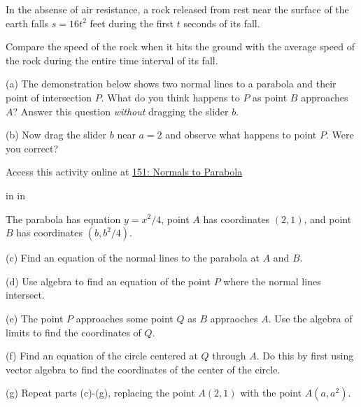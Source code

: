 \documentclass{ximera}
\newcommand{\pskip}{\vskip 0.1 in}
\begin{document}
\begin{question}  \label{Qdfgbbvvd}
In the absense of air resistance, a rock released from rest near the surface of the earth falls $s=16t^2$ feet during the first $t$ seconds of its fall.

Compare the speed of the rock when it hits the ground with the average speed of the rock during the entire time interval of its fall.
\end{question}



\begin{question}  \label{Qwerdfggg}
(a) The demonstration below shows two normal lines to a parabola and their point of intersection $P$. What do you think happens to $P$ as point $B$ approaches $A$? Answer this question \emph{without} dragging the slider $b$.

(b) Now drag the slider $b$ near $a=2$ and observe what happens to point $P$. Were you correct? 


 
\begin{onlineOnly}
    \begin{center}
\end{center}
\end{onlineOnly}
Access this activity online at \href{https://www.desmos.com/calculator/ybaivhc2tl}{151: Normals to Parabola}

\pskip \pskip

The parabola has equation $y=x^2/4$, point $A$ has coordinates $(2,1)$, and point $B$ has coordinates $(b,b^2/4)$. 

(c) Find an equation of the normal lines to the parabola at $A$ and $B$.

(d) Use algebra to find an equation of the point $P$ where the normal lines intersect.

(e) The point $P$ approaches some point $Q$ as $B$ appraoches $A$. Use the algebra of limits to find the coordinates of $Q$.

(f) Find an equation of the circle centered at $Q$ through $A$. Do this by first using vector algebra to find the coordinates of the center of the circle.

(g) Repeat parts (c)-(g), replacing the point $A(2,1)$ with the point $A(a,a^2)$.


\end{question}
\end{document}

